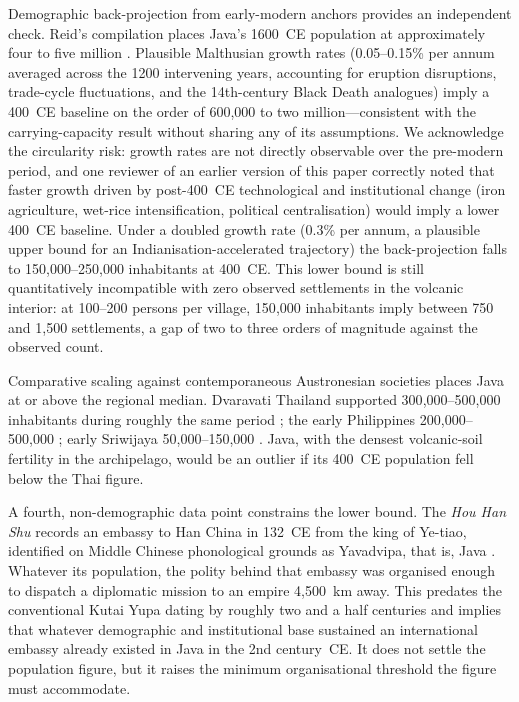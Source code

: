\documentclass[12pt,a4paper]{article}
\begin{document}
Demographic back-projection from early-modern anchors provides an independent check. Reid's compilation places Java's 1600~CE population at approximately four to five million \citep{reid1988}. Plausible Malthusian growth rates (0.05--0.15\% per annum averaged across the 1200 intervening years, accounting for eruption disruptions, trade-cycle fluctuations, and the 14th-century Black Death analogues) imply a 400~CE baseline on the order of 600{,}000 to two million---consistent with the carrying-capacity result without sharing any of its assumptions. We acknowledge the circularity risk: growth rates are not directly observable over the pre-modern period, and one reviewer of an earlier version of this paper correctly noted that faster growth driven by post-400~CE technological and institutional change (iron agriculture, wet-rice intensification, political centralisation) would imply a lower 400~CE baseline. Under a doubled growth rate (0.3\% per annum, a plausible upper bound for an Indianisation-accelerated trajectory) the back-projection falls to 150{,}000--250{,}000 inhabitants at 400~CE. This lower bound is still quantitatively incompatible with zero observed settlements in the volcanic interior: at 100--200 persons per village, 150{,}000 inhabitants imply between 750 and 1{,}500 settlements, a gap of two to three orders of magnitude against the observed count.

Comparative scaling against contemporaneous Austronesian societies places Java at or above the regional median. Dvaravati Thailand supported 300{,}000--500{,}000 inhabitants during roughly the same period \citep{higham2014}; the early Philippines 200{,}000--500{,}000 \citep{junker1999}; early Sriwijaya 50{,}000--150{,}000 \citep{manguin2004}. Java, with the densest volcanic-soil fertility in the archipelago, would be an outlier if its 400~CE population fell below the Thai figure.

A fourth, non-demographic data point constrains the lower bound. The \textit{Hou Han Shu} records an embassy to Han China in 132~CE from the king of Ye-tiao, identified on Middle Chinese phonological grounds as Yavadvipa, that is, Java \citep{pelliot1916,wolters1967}. Whatever its population, the polity behind that embassy was organised enough to dispatch a diplomatic mission to an empire 4{,}500~km away. This predates the conventional Kutai Yupa dating by roughly two and a half centuries and implies that whatever demographic and institutional base sustained an international embassy already existed in Java in the 2nd century~CE. It does not settle the population figure, but it raises the minimum organisational threshold the figure must accommodate.
\end{document}
